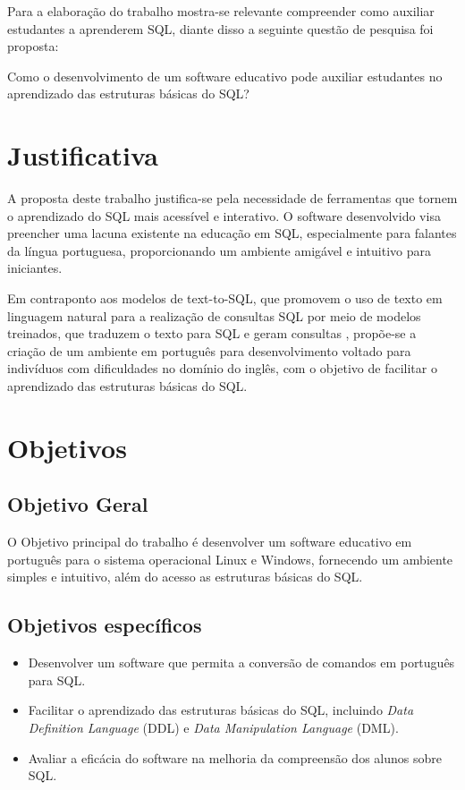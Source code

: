 Para a elaboração do trabalho mostra-se relevante compreender como auxiliar estudantes a aprenderem SQL, diante disso a seguinte questão de pesquisa foi proposta:

Como o desenvolvimento de um software educativo pode auxiliar estudantes no aprendizado das estruturas básicas do SQL?

\section{Justificativa}
A proposta deste trabalho justifica-se pela necessidade de ferramentas que tornem o aprendizado do SQL mais acessível e interativo. O software desenvolvido visa preencher uma lacuna existente na educação em SQL, especialmente para falantes da língua portuguesa, proporcionando um ambiente amigável e intuitivo para iniciantes.

Em contraponto aos modelos de text-to-SQL, que promovem o uso de texto em linguagem natural para a realização de consultas SQL por meio de modelos treinados, que traduzem o texto para SQL e geram consultas \cite{Jose2023}, propõe-se a criação de um ambiente em português para desenvolvimento voltado para indivíduos com dificuldades no domínio do inglês, com o objetivo de facilitar o aprendizado das estruturas básicas do SQL.



\section{Objetivos}
\label{sec:objetivos}

\subsection{Objetivo Geral}

O Objetivo principal do trabalho é desenvolver um software educativo em português para o sistema operacional Linux e Windows, fornecendo um ambiente simples e intuitivo, além do acesso as estruturas básicas do SQL.

\subsection{Objetivos específicos}
\begin{itemize}
    \item Desenvolver um software que permita a conversão de comandos em português para SQL.
    \item Facilitar o aprendizado das estruturas básicas do SQL, incluindo \textit{Data Definition Language} (DDL) e \textit{Data Manipulation Language} (DML).
    \item Avaliar a eficácia do software na melhoria da compreensão dos alunos sobre SQL.
\end{itemize}

